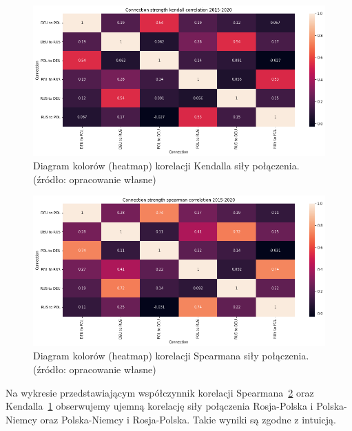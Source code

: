 \documentclass[11pt]{report}
\begin{document}
    \begin{figure}[!ht]
        \centering
        \includegraphics[width=\linewidth]{../spade_proto/figures/correlation/Connection strength kendall correlation 2015-2020.png}
        \caption{Diagram kolorów (heatmap) korelacji Kendalla siły połączenia. (źródło: opracowanie własne)}
        \label{fig:Connection strength kendall correlation 2015-2020}
    \end{figure}

    \begin{figure}[!ht]
        \centering
        \includegraphics[width=\linewidth]{../spade_proto/figures/correlation/Connection strength spearman correlation 2015-2020.png}
        \caption{Diagram kolorów (heatmap) korelacji Spearmana siły połączenia. (źródło: opracowanie własne)}
        \label{fig:Connection strength spearman correlation 2015-2020}
    \end{figure}

    Na wykresie przedstawiającym współczynnik korelacji Spearmana~\ref{fig:Connection strength spearman correlation 2015-2020}
    oraz Kendalla~\ref{fig:Connection strength kendall correlation 2015-2020}
    obserwujemy ujemną korelację siły połączenia Rosja-Polska i Polska-Niemcy oraz Polska-Niemcy i Rosja-Polska.
    Takie wyniki są zgodne z intuicją.
\end{document}
